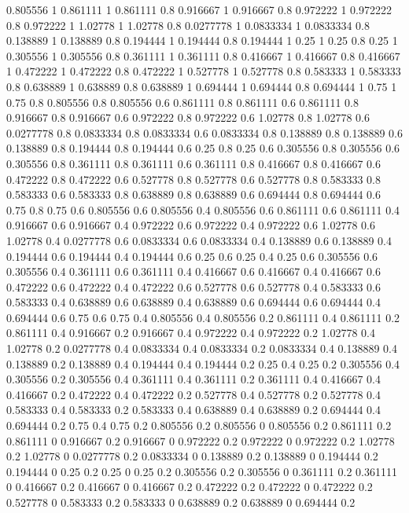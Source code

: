 0.805556 1
0.861111 1
0.861111 0.8
0.916667 1
0.916667 0.8
0.972222 1
0.972222 0.8
0.972222 1
1.02778 1
1.02778 0.8
0.0277778 1
0.0833334 1
0.0833334 0.8
0.138889 1
0.138889 0.8
0.194444 1
0.194444 0.8
0.194444 1
0.25 1
0.25 0.8
0.25 1
0.305556 1
0.305556 0.8
0.361111 1
0.361111 0.8
0.416667 1
0.416667 0.8
0.416667 1
0.472222 1
0.472222 0.8
0.472222 1
0.527778 1
0.527778 0.8
0.583333 1
0.583333 0.8
0.638889 1
0.638889 0.8
0.638889 1
0.694444 1
0.694444 0.8
0.694444 1
0.75 1
0.75 0.8
0.805556 0.8
0.805556 0.6
0.861111 0.8
0.861111 0.6
0.861111 0.8
0.916667 0.8
0.916667 0.6
0.972222 0.8
0.972222 0.6
1.02778 0.8
1.02778 0.6
0.0277778 0.8
0.0833334 0.8
0.0833334 0.6
0.0833334 0.8
0.138889 0.8
0.138889 0.6
0.138889 0.8
0.194444 0.8
0.194444 0.6
0.25 0.8
0.25 0.6
0.305556 0.8
0.305556 0.6
0.305556 0.8
0.361111 0.8
0.361111 0.6
0.361111 0.8
0.416667 0.8
0.416667 0.6
0.472222 0.8
0.472222 0.6
0.527778 0.8
0.527778 0.6
0.527778 0.8
0.583333 0.8
0.583333 0.6
0.583333 0.8
0.638889 0.8
0.638889 0.6
0.694444 0.8
0.694444 0.6
0.75 0.8
0.75 0.6
0.805556 0.6
0.805556 0.4
0.805556 0.6
0.861111 0.6
0.861111 0.4
0.916667 0.6
0.916667 0.4
0.972222 0.6
0.972222 0.4
0.972222 0.6
1.02778 0.6
1.02778 0.4
0.0277778 0.6
0.0833334 0.6
0.0833334 0.4
0.138889 0.6
0.138889 0.4
0.194444 0.6
0.194444 0.4
0.194444 0.6
0.25 0.6
0.25 0.4
0.25 0.6
0.305556 0.6
0.305556 0.4
0.361111 0.6
0.361111 0.4
0.416667 0.6
0.416667 0.4
0.416667 0.6
0.472222 0.6
0.472222 0.4
0.472222 0.6
0.527778 0.6
0.527778 0.4
0.583333 0.6
0.583333 0.4
0.638889 0.6
0.638889 0.4
0.638889 0.6
0.694444 0.6
0.694444 0.4
0.694444 0.6
0.75 0.6
0.75 0.4
0.805556 0.4
0.805556 0.2
0.861111 0.4
0.861111 0.2
0.861111 0.4
0.916667 0.2
0.916667 0.4
0.972222 0.4
0.972222 0.2
1.02778 0.4
1.02778 0.2
0.0277778 0.4
0.0833334 0.4
0.0833334 0.2
0.0833334 0.4
0.138889 0.4
0.138889 0.2
0.138889 0.4
0.194444 0.4
0.194444 0.2
0.25 0.4
0.25 0.2
0.305556 0.4
0.305556 0.2
0.305556 0.4
0.361111 0.4
0.361111 0.2
0.361111 0.4
0.416667 0.4
0.416667 0.2
0.472222 0.4
0.472222 0.2
0.527778 0.4
0.527778 0.2
0.527778 0.4
0.583333 0.4
0.583333 0.2
0.583333 0.4
0.638889 0.4
0.638889 0.2
0.694444 0.4
0.694444 0.2
0.75 0.4
0.75 0.2
0.805556 0.2
0.805556 0
0.805556 0.2
0.861111 0.2
0.861111 0
0.916667 0.2
0.916667 0
0.972222 0.2
0.972222 0
0.972222 0.2
1.02778 0.2
1.02778 0
0.0277778 0.2
0.0833334 0
0.138889 0.2
0.138889 0
0.194444 0.2
0.194444 0
0.25 0.2
0.25 0
0.25 0.2
0.305556 0.2
0.305556 0
0.361111 0.2
0.361111 0
0.416667 0.2
0.416667 0
0.416667 0.2
0.472222 0.2
0.472222 0
0.472222 0.2
0.527778 0
0.583333 0.2
0.583333 0
0.638889 0.2
0.638889 0
0.694444 0.2
